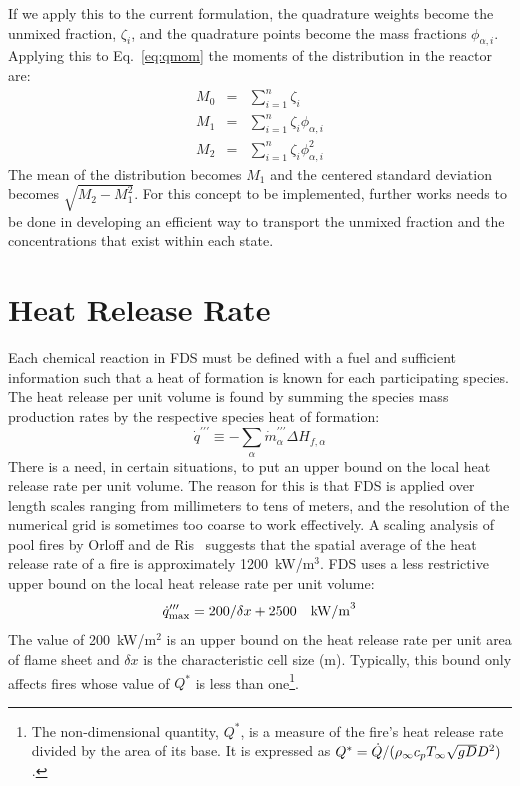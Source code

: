 If we apply this to the current formulation, the quadrature weights become the unmixed fraction, $\zeta_{i}$, and the quadrature points become the mass fractions $\phi_{\alpha,i}$. Applying this to Eq.~\ref{eq:qmom} the moments of the distribution in the reactor are:
\begin{eqnarray}\label{eq:moments}
M_{0} &=& \displaystyle \sum_{i=1}^{n} \zeta_{i} \\
\nonumber M_{1} &=& \displaystyle \sum_{i=1}^{n} \zeta_{i} \phi_{\alpha,i} \\
\nonumber M_{2} &=& \displaystyle \sum_{i=1}^{n} \zeta_{i} \phi_{\alpha,i}^2
\end{eqnarray}
The mean of the distribution becomes $M_{1}$ and the centered standard deviation becomes $\sqrt{M_{2}-M_{1}^{2}}$. For this concept to be implemented, further works needs to be done in developing an efficient way to transport the unmixed fraction and the concentrations that exist within each state.

\section{Heat Release Rate}

Each chemical reaction in FDS must be defined with a fuel and sufficient information such that a heat of formation is known for each participating species. The heat release per unit volume is found by summing the species mass production rates by the respective species heat of formation:
\begin{equation}\label{eq:vol_heat_gen}
\dot{q}^{\prime\prime\prime} \equiv -\displaystyle \sum_{\alpha} \dot{m}^{\prime\prime\prime}_{\alpha} \Delta H_{f,\alpha}
\end{equation}
There is a need, in certain situations, to put an upper bound on the local heat release rate per unit volume. The reason for
this is that FDS is applied over length scales ranging from millimeters to tens of meters, and the resolution of the numerical grid
is sometimes too coarse to work effectively.
A scaling analysis of pool fires by Orloff and de Ris~\cite{Orloff:19th_Symposium} suggests that the spatial average of the
heat release rate of a fire is approximately 1200~kW/m$^3$. FDS uses a less restrictive upper bound on the local heat release rate per unit volume:
\begin{equation}\label{eq:q_bound} 
\dot{q}_{\max}''' = 200/\delta x + 2500 \quad \hbox{kW/m}^3 
\end{equation}
The value of 200~kW/m$^2$ is an upper bound on the heat release rate per unit area of flame sheet and $\delta x$ is the characteristic cell size (m). Typically, this bound only affects fires whose value of $Q^*$ is less than one\footnote{The non-dimensional quantity, $Q^*$, is a measure of the fire's heat release rate divided by the
area of its base. It is expressed as $Q^*=\dot{Q}/(\rho_\infty c_p T_\infty \sqrt{g D} D^2)$.}.

